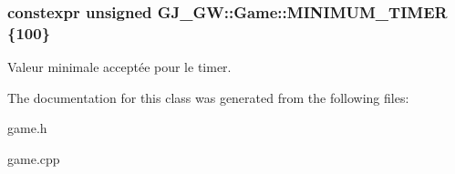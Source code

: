 \subsubsection[{\texorpdfstring{M\+I\+N\+I\+M\+U\+M\+\_\+\+T\+I\+M\+ER}{MINIMUM_TIMER}}]{\setlength{\rightskip}{0pt plus 5cm}constexpr unsigned G\+J\+\_\+\+G\+W\+::\+Game\+::\+M\+I\+N\+I\+M\+U\+M\+\_\+\+T\+I\+M\+ER \{100\}\hspace{0.3cm}{\ttfamily [static]}}\hypertarget{class_g_j___g_w_1_1_game_a4f6cc808814a6884659f89dae6a7b150}{}\label{class_g_j___g_w_1_1_game_a4f6cc808814a6884659f89dae6a7b150}
Valeur minimale acceptée pour le timer. 

The documentation for this class was generated from the following files\+:\begin{DoxyCompactItemize}
\item 
game.\+h\item 
game.\+cpp\end{DoxyCompactItemize}
